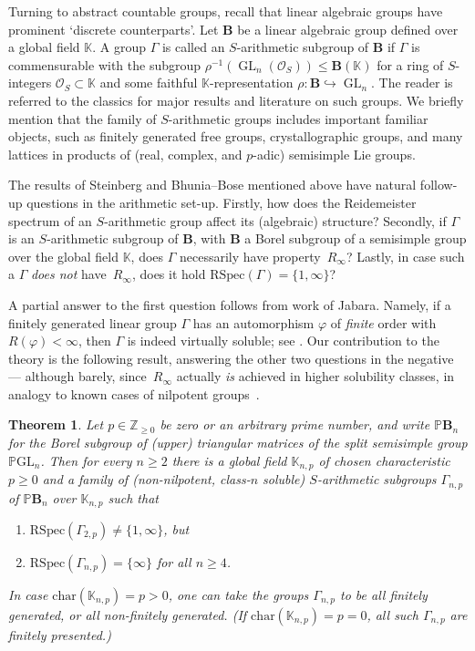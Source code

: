 \documentclass[a4paper,11pt]{amsart}
\numberwithin{equation}{section}
\theoremstyle{plain}
\newtheorem{thm}{Theorem}[section]
\theoremstyle{definition}
\newcommand{\Z}{\mathbb{Z}}
\newcommand{\K}{\mathbb{K}}
\newcommand{\OS}{\mathcal{O}_S}
\DeclareMathOperator{\GL}{GL} %
\newcommand{\PGL}{\mathbb{P}\mathrm{GL}}
\newcommand{\mbB}{\mathbf{B}} %
\newcommand{\PB}{\mathbb{P}\mathbf{B}} %
\newcommand{\phee}{\varphi} %
\newcommand{\into}{\hookrightarrow}
\newcommand{\Ri}{R_{\infty}} %
\newcommand{\RSpec}{\mathrm{RSpec}}
\begin{document}
Turning to abstract countable groups, recall that linear algebraic groups have prominent `discrete counterparts'. Let $\mbB$ be a linear algebraic group defined over a global field $\K$. A group $\Gamma$ is called an $S$-arithmetic subgroup of $\mbB$ if $\Gamma$ is commensurable with the subgroup $\rho^{-1}(\GL_n(\OS)) \leq \mbB(\K)$ for a ring of $S$-integers $\OS \subset \K$ and some faithful $\K$-representation $\rho : \mbB \into \GL_n$. 
The reader is referred to the classics \cite{Margulis,PlatonovRapinchuk} for major results and literature on such groups. We briefly mention that the family of $S$-arithmetic groups includes important familiar objects, such as finitely generated free groups, crystallographic groups, and many lattices in products of (real, complex, and $p$-adic) semisimple Lie groups.

The results of Steinberg and Bhunia--Bose mentioned above have natural follow-up questions in the arithmetic set-up. Firstly, how does the Reidemeister spectrum of an $S$-arithmetic group affect its (algebraic) structure? Secondly, if $\Gamma$ is an $S$-arithmetic subgroup of $\mbB$, with $\mbB$ a Borel subgroup of a semisimple group over the global field $\K$, does $\Gamma$ necessarily have property~$\Ri$? Lastly, in case such a $\Gamma$ \emph{does not} have~$\Ri$, does it hold $\RSpec(\Gamma) = \{1, \infty\}$? 

A partial answer to the first question follows from work of Jabara. Namely, if a finitely generated linear group $\Gamma$ has an automorphism $\phee$ of \emph{finite} order with $R(\phee) < \infty$, then $\Gamma$ is indeed virtually soluble; see \cite[Theorem~C]{Jabara}. Our contribution to the theory is the following result, answering the other two questions in the negative --- although barely, since~$\Ri$ actually \emph{is} achieved in higher solubility classes, in analogy to known cases of nilpotent groups~\cite{DacibergWongCrelle,Romankov,KarelDacibergNil,TimurUniTri}.

\begin{thm} \label{thm:Lieapplication}
Let $p \in \Z_{\geq 0}$ be zero or an arbitrary prime number, and write $\PB_n$ for the Borel subgroup of (upper) triangular matrices of the split semisimple group $\PGL_n$. Then for every $n \geq 2$ there is a global field $\K_{n,p}$ of chosen characteristic $p \geq 0$ and a family of (\emph{non-nilpotent}, class-$n$ soluble) $S$-arithmetic subgroups $\Gamma_{n,p}$ of $\PB_n$ over $\K_{n,p}$ such that 
\begin{enumerate}
    \item $\RSpec(\Gamma_{2,p}) \neq \{1,\infty\}$, but 
    \item $\RSpec(\Gamma_{n,p}) = \{\infty\}$ for all $n \geq 4$.
\end{enumerate}
In case $\mathrm{char}(\K_{n,p}) = p > 0$, one can take the groups $\Gamma_{n,p}$ to be all finitely generated, or all non-finitely generated. (If $\mathrm{char}(\K_{n,p}) = p = 0$, all such $\Gamma_{n,p}$ are finitely presented.)
\end{thm}
\end{document}
